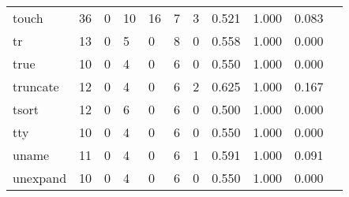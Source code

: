 \begin{longtable}{lp{1.10cm}p{1.10cm}p{1.10cm}p{1.10cm}p{1.10cm}p{1.10cm}p{1.10cm}p{1.10cm}p{1.10cm}p{1.10cm}}
touch     &                     36 &                                  0 &                                10 &                               16 &                                 7 &                               3 &                          0.521 &                                 1.000 &                               0.083 \\
tr        &                     13 &                                  0 &                                 5 &                                0 &                                 8 &                               0 &                          0.558 &                                 1.000 &                               0.000 \\
true      &                     10 &                                  0 &                                 4 &                                0 &                                 6 &                               0 &                          0.550 &                                 1.000 &                               0.000 \\
truncate  &                     12 &                                  0 &                                 4 &                                0 &                                 6 &                               2 &                          0.625 &                                 1.000 &                               0.167 \\
tsort     &                     12 &                                  0 &                                 6 &                                0 &                                 6 &                               0 &                          0.500 &                                 1.000 &                               0.000 \\
tty       &                     10 &                                  0 &                                 4 &                                0 &                                 6 &                               0 &                          0.550 &                                 1.000 &                               0.000 \\
uname     &                     11 &                                  0 &                                 4 &                                0 &                                 6 &                               1 &                          0.591 &                                 1.000 &                               0.091 \\
unexpand  &                     10 &                                  0 &                                 4 &                                0 &                                 6 &                               0 &                          0.550 &                                 1.000 &                               0.000 \\

\end{longtable}
